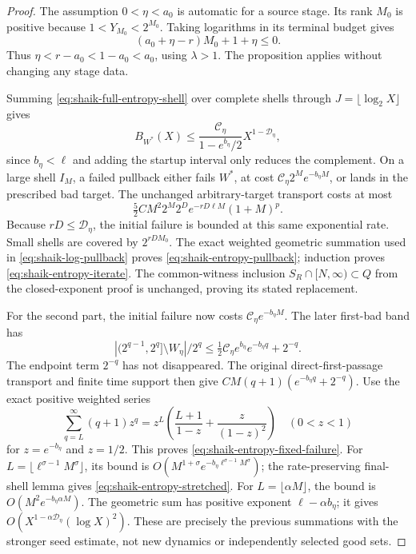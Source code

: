 \documentclass[11pt]{article}
\theoremstyle{remark}\newtheorem{remark}[proposition]{Remark}
\begin{document}
\begin{proof}
The assumption \(0<\eta<a_0\) is automatic for a source stage.
Its rank \(M_0\) is positive because \(1<Y_{M_0}<2^{M_0}\).
Taking logarithms in its terminal budget gives
\[
 (a_0+\eta-r)M_0+1+\eta\le0 .
\]
Thus \(\eta<r-a_0<1-a_0<a_0\), using \(\lambda>1\).
The proposition applies without changing any stage data.

Summing \eqref{eq:shaik-full-entropy-shell} over complete shells
through \(J=\lfloor\log_2X\rfloor\) gives
\[
 B_{W^*}(X)\le
 \frac{\mathcal C_\eta}{1-e^{b_\eta}/2}
    X^{1-\mathcal D_\eta},
\]
since \(b_\eta<\ell\) and adding the startup interval only reduces
the complement. On a large shell \(I_M\), a failed pullback either
fails \(W^*\), at cost
\(\mathcal C_\eta2^Me^{-b_\eta M}\), or lands in the prescribed
bad target. The unchanged arbitrary-target transport costs at most
\[
 \tfrac52 C M^2 2^M
       2^D e^{-rD\ell M}(1+M)^p .
\]
Because \(rD\le\mathcal D_\eta\), the initial failure is bounded at
this same exponential rate. Small shells are covered by
\(2^{rDM_0}\). The exact weighted geometric summation used in
\eqref{eq:shaik-log-pullback} proves
\eqref{eq:shaik-entropy-pullback}; induction proves
\eqref{eq:shaik-entropy-iterate}. The common-witness inclusion
\(S_R\cap[N,\infty)\subset Q\) from the closed-exponent proof is
unchanged, proving its stated replacement.

For the second part, the initial failure now costs
\(\mathcal C_\eta e^{-b_\eta M}\). The later first-bad band has
\[
 |(2^{q-1},2^q]\setminus W_\eta|/2^q
 \le \tfrac12\mathcal C_\eta e^{b_\eta}e^{-b_\eta q}+2^{-q}.
\]
The endpoint term \(2^{-q}\) has not disappeared.
The original direct-first-passage transport and finite time support
then give
\(CM(q+1)(e^{-b_\eta q}+2^{-q})\).
Use the exact positive weighted series
\[
 \sum_{q=L}^\infty(q+1)z^q
   =z^L\left(\frac{L+1}{1-z}+\frac{z}{(1-z)^2}\right)
 \quad(0<z<1)
\]
for \(z=e^{-b_\eta}\) and \(z=1/2\).
This proves \eqref{eq:shaik-entropy-fixed-failure}.
For \(L=\lfloor\ell^{\sigma-1}M^\sigma\rfloor\), its bound is
\(O(M^{1+\sigma}e^{-b_\eta\ell^{\sigma-1}M^\sigma})\);
the rate-preserving final-shell lemma gives
\eqref{eq:shaik-entropy-stretched}.
For \(L=\lfloor\alpha M\rfloor\), the bound is
\(O(M^2e^{-b_\eta\alpha M})\).
The geometric sum has positive exponent \(\ell-\alpha b_\eta\);
it gives \(O(X^{1-\alpha\mathcal D_\eta}(\log X)^2)\).
These are precisely the previous summations with the stronger
seed estimate, not new dynamics or independently selected good sets.
\end{proof}
\end{document}
